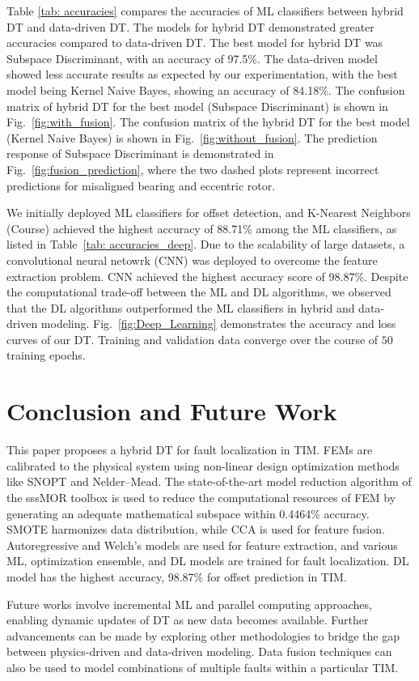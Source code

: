 \documentclass[a4paper,conference]{IEEEtran}
\begin{document}
Table \ref{tab: accuracies} compares the accuracies of ML classifiers between hybrid DT and data-driven DT. The models for hybrid DT demonstrated greater accuracies compared to data-driven DT. The best model for hybrid DT was Subspace Discriminant, with an accuracy of 97.5\%. The data-driven model showed less accurate results as expected by our experimentation, with the best model being Kernel Naive Bayes, showing an accuracy of 84.18\%. The confusion matrix of hybrid DT for the best model (Subspace Discriminant) is shown in Fig.~\ref{fig:with_fusion}. The confusion matrix of the hybrid DT for the best model (Kernel Naive Bayes) is shown in Fig.~\ref{fig:without_fusion}. The prediction response of Subspace Discriminant is demonstrated in Fig.~\ref{fig:fusion_prediction}, where the two dashed plots represent incorrect predictions for misaligned bearing and eccentric rotor.

We initially deployed ML classifiers for offset detection, and K-Nearest Neighbors (Course) achieved the highest accuracy of 88.71\% among the ML classifiers, as listed in Table~\ref{tab: accuracies_deep}. Due to the scalability of large datasets, a convolutional neural netowrk (CNN) was deployed to overcome the feature extraction problem. CNN achieved the highest accuracy score of 98.87\%. Despite the computational trade-off between the ML and DL algorithms, we observed that the DL algorithms outperformed the ML classifiers in hybrid and data-driven modeling. Fig.~\ref{fig:Deep_Learning} demonstrates the accuracy and loss curves of our DT. Training and validation data converge over the course of $50$ training epochs. 

\section{Conclusion and Future Work}\label{sec:conclusion}
This paper proposes a hybrid DT for fault localization in TIM. FEMs are calibrated to the physical system using non-linear design optimization methods like SNOPT and Nelder–Mead. The state-of-the-art model reduction algorithm of the sssMOR toolbox is used to reduce the computational resources of FEM by generating an adequate mathematical subspace within 0.4464\% accuracy. SMOTE harmonizes data distribution, while CCA is used for feature fusion. Autoregressive and Welch’s models are used for feature extraction, and various ML, optimization ensemble, and DL models are trained for fault localization. DL model has the highest accuracy, 98.87\% for offset prediction in TIM. 

Future works involve incremental ML and parallel computing approaches, enabling dynamic updates of DT as new data becomes available. 
Further advancements can be made by exploring other methodologies to bridge the gap between physics-driven and data-driven modeling. Data fusion techniques can also be used to model combinations of multiple faults within a particular TIM. 



	
\end{document}
